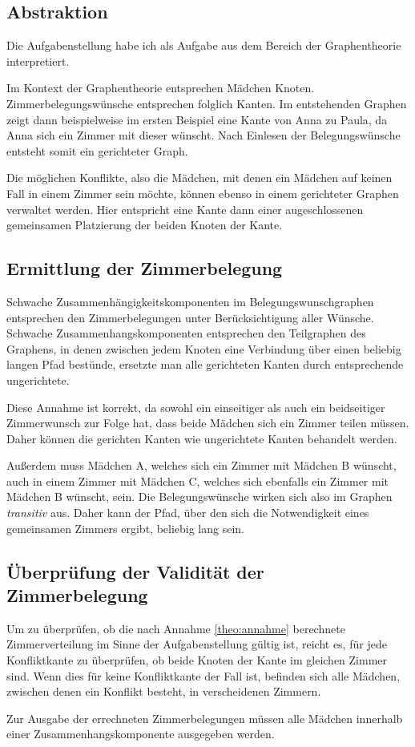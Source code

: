 \subsection{Abstraktion}
Die Aufgabenstellung habe ich als Aufgabe aus dem Bereich der Graphentheorie
interpretiert.

Im Kontext der Graphentheorie entsprechen Mädchen Knoten.
Zimmerbelegungswünsche entsprechen folglich Kanten.
Im entstehenden Graphen zeigt dann beispielweise im ersten Beispiel eine Kante von Anna
zu Paula, da Anna sich ein Zimmer mit dieser wünscht.
Nach Einlesen der Belegungswünsche entsteht somit ein gerichteter Graph.

Die möglichen Konflikte, also die Mädchen, mit denen ein Mädchen auf keinen Fall
in einem Zimmer sein möchte, können ebenso in einem gerichteter Graphen verwaltet werden.
Hier entspricht eine Kante dann einer augeschlossenen gemeinsamen Platzierung der beiden Knoten der Kante.

\subsection{Ermittlung der Zimmerbelegung}
\begin{annahme} \label{theo:annahme}
Schwache Zusammenhängigkeitskomponenten im Belegungswunschgraphen entsprechen den Zimmerbelegungen unter Berücksichtigung aller Wünsche.
Schwache Zusammenhangskomponenten\autocite[Definiton. Gerichtete Graphen]{WikiZus}
entsprechen den Teilgraphen des Graphens, in  denen zwischen jedem Knoten eine Verbindung über einen beliebig langen Pfad bestünde,
ersetzte man alle gerichteten Kanten durch entsprechende ungerichtete.
\end{annahme}

Diese Annahme ist korrekt, da sowohl ein einseitiger als auch ein beidseitiger Zimmerwunsch zur Folge hat, dass beide Mädchen sich ein Zimmer teilen müssen. Daher können die gerichten Kanten wie ungerichtete Kanten behandelt werden.

Außerdem muss Mädchen A, welches sich ein Zimmer mit Mädchen B wünscht, auch in einem Zimmer mit Mädchen C, welches sich ebenfalls ein Zimmer mit Mädchen B wünscht, sein. Die Belegungswünsche wirken sich also im Graphen \textit{transitiv} aus. Daher kann der Pfad, über den sich die Notwendigkeit eines gemeinsamen Zimmers ergibt, beliebig lang sein.

\subsection{Überprüfung der Validität der Zimmerbelegung}
Um zu überprüfen, ob die nach Annahme \ref{theo:annahme} berechnete Zimmerverteilung im Sinne der Aufgabenstellung gültig ist, reicht es,
für jede Konfliktkante zu überprüfen, ob beide Knoten der Kante im gleichen Zimmer sind.
Wenn dies für keine Konfliktkante der Fall ist, befinden sich alle Mädchen, zwischen denen ein Konflikt besteht, in verscheidenen Zimmern.

Zur Ausgabe der errechneten Zimmerbelegungen müssen alle Mädchen innerhalb einer Zusammenhangskomponente ausgegeben werden.
